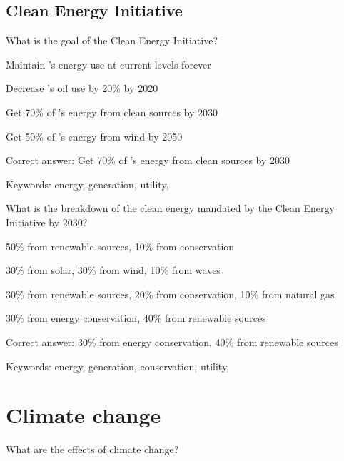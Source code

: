 \subsection{\Hawaii Clean Energy Initiative}

\begin{question}
	\item What is the goal of the \Hawaii Clean Energy Initiative?
\end{question}

\begin{answer}
	\item Maintain \Hawaii's energy use at current levels forever
	\item Decrease \Hawaii's oil use by 20\% by 2020
	\item Get 70\% of \Hawaii's energy from clean sources by 2030
	\item Get 50\% of \Hawaii's energy from wind by 2050
\end{answer}

Correct answer: Get 70\% of \Hawaii's energy from clean sources by 2030

Keywords: energy, generation, utility, \Hawaii

\begin{question}
	\item What is the breakdown of the clean energy mandated by the \Hawaii Clean Energy Initiative by 2030?
\end{question}

\begin{answer}
	\item 50\% from renewable sources, 10\% from conservation
	\item 30\% from solar, 30\% from wind, 10\% from waves
	\item 30\% from renewable sources, 20\% from conservation, 10\% from natural gas
	\item 30\% from energy conservation, 40\% from renewable sources
\end{answer}

Correct answer: 30\% from energy conservation, 40\% from renewable sources

Keywords: energy, generation, conservation, utility, \Hawaii

\section{Climate change}

\begin{question}
	\item What are the effects of climate change?
\end{question}

